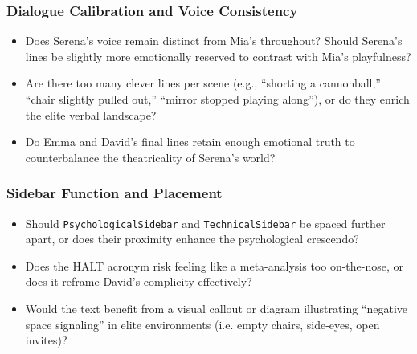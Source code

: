 \subsubsection*{Dialogue Calibration and Voice Consistency}

\begin{itemize}
  \item Does Serena’s voice remain distinct from Mia’s throughout? Should Serena’s lines be slightly more emotionally reserved to contrast with Mia’s playfulness?
  \item Are there too many clever lines per scene (e.g., ``shorting a cannonball,'' ``chair slightly pulled out,'' ``mirror stopped playing along''), or do they enrich the elite verbal landscape?
  \item Do Emma and David’s final lines retain enough emotional truth to counterbalance the theatricality of Serena’s world?
\end{itemize}

\subsubsection*{Sidebar Function and Placement}

\begin{itemize}
  \item Should \texttt{PsychologicalSidebar} and \texttt{TechnicalSidebar} be spaced further apart, or does their proximity enhance the psychological crescendo?
  \item Does the HALT acronym risk feeling like a meta-analysis too on-the-nose, or does it reframe David’s complicity effectively?
  \item Would the text benefit from a visual callout or diagram illustrating “negative space signaling” in elite environments (i.e. empty chairs, side-eyes, open invites)?
\end{itemize}
